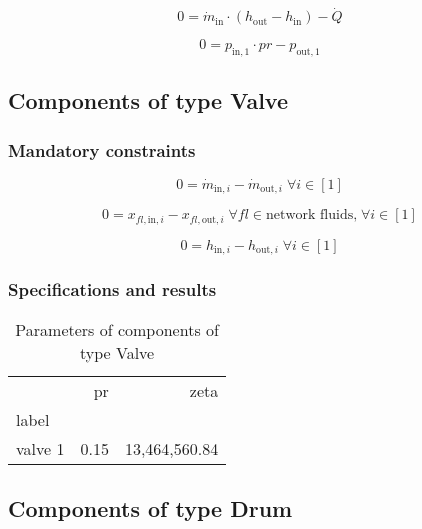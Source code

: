 \documentclass[]{article}
\begin{document}
\begin{equation}
\label{eq:HeatExchangerSimple_Q}
0 = \dot{m}_\mathrm{in} \cdot \left(h_\mathrm{out} - h_\mathrm{in} \right) -\dot{Q}
\end{equation}

\begin{equation}
\label{eq:HeatExchangerSimple_pr}
0=p_\mathrm{in,1}\cdot pr - p_\mathrm{out,1}
\end{equation}


\subsection{Components of type Valve}

\subsubsection{Mandatory constraints}

\begin{equation}
\label{eq:Valve_mass_flow_constraints}
0=\dot{m}_{\mathrm{in,}i}-\dot{m}_{\mathrm{out,}i}\; \forall i \in [1]
\end{equation}

\begin{equation}
\label{eq:Valve_fluid_constraints}
0=x_{fl\mathrm{,in,}i}-x_{fl\mathrm{,out,}i}\;\forall fl \in\text{network fluids,}\; \forall i \in [1]
\end{equation}

\begin{equation}
\label{eq:Valve_enthalpy_equality_constraints}
0=h_{\mathrm{in,}i}-h_{\mathrm{out,}i}\; \forall i \in [1]
\end{equation}


\subsubsection{Specifications and results}

\begin{table}[H]
\centering
\caption{Parameters of components of type Valve}
\begin{tabular}{lrr}
\toprule
{} &    pr &           zeta \\
label   &       &                \\
\midrule
valve 1 &  0.15 &  13,464,560.84 \\
\bottomrule
\end{tabular}
\end{table}
\subsection{Components of type Drum}
\end{document}
